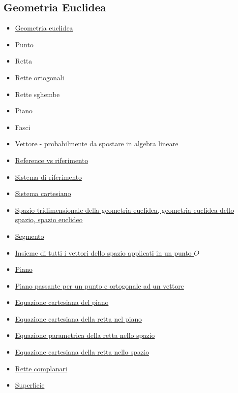 \documentclass[a4paper,10pt]{article}
\begin{document}
\subsection*{Geometria Euclidea}
  \begin{itemize}   
   \item \href{./GeometriaEuclidea.html}{Geometria euclidea}	
   \item Punto
   \item Retta
   \item Rette ortogonali
   \item Rette sghembe
   \item Piano
   \item Fasci
   \item \href{./Vettore.html}{Vettore - probabilmente da spostare in algebra lineare}
   \item \href{./Reference.html}{Reference vs riferimento}
   \item \href{./SistemaRiferimento.html}{Sistema di riferimento}
   \item \href{./SistemaCartesiano.html}{Sistema cartesiano}   
   \item \href{./GeometriaEuclidea3d.html}{Spazio tridimensionale della geometria euclidea, geometria euclidea dello spazio, spazio euclideo}
   \item \href{./Segmento.html}{Segmento}
   \item \href{./InsiemeVettoriApplicati.html}{Insieme di tutti i vettori dello spazio applicati in un punto $O$}
   \item \href{./Piano.html}{Piano}
   \item \href{./PianoPassantePunto.html}{Piano passante per un punto e ortogonale ad un vettore}
   \item \href{./EquazioneCartesianaPiano.html}{Equazione cartesiana del piano}
   \item \href{./EquazioneCartesianaRettaPiano.html}{Equazione cartesiana della retta nel piano}
   \item \href{./EquazioneParametricaRettaSpazio.html}{Equazione parametrica della retta nello spazio}
   \item \href{./EquazioneCartesianaRetta.html}{Equazione cartesiana della retta nello spazio}
   \item \href{./RetteComplanari.html}{Rette complanari}
   \item \href{./Superficie.html}{Superficie}
  \end{itemize}
\end{document}
